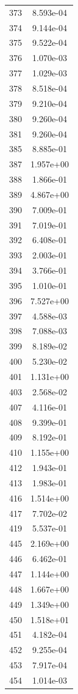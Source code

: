 \documentclass[12pt]{article}
\begin{document}
\begin{longtable}{@{}cc@{}}
373 & 8.593e-04 \\
374 & 9.144e-04 \\
375 & 9.522e-04 \\
376 & 1.070e-03 \\
377 & 1.029e-03 \\
378 & 8.518e-04 \\
379 & 9.210e-04 \\
380 & 9.260e-04 \\
381 & 9.260e-04 \\
385 & 8.885e-01 \\
387 & 1.957e+00 \\
388 & 1.866e-01 \\
389 & 4.867e+00 \\
390 & 7.009e-01 \\
391 & 7.019e-01 \\
392 & 6.408e-01 \\
393 & 2.003e-01 \\
394 & 3.766e-01 \\
395 & 1.010e-01 \\
396 & 7.527e+00 \\
397 & 4.588e-03 \\
398 & 7.088e-03 \\
399 & 8.189e-02 \\
400 & 5.230e-02 \\
401 & 1.131e+00 \\
403 & 2.568e-02 \\
407 & 4.116e-01 \\
408 & 9.399e-01 \\
409 & 8.192e-01 \\
410 & 1.155e+00 \\
412 & 1.943e-01 \\
413 & 1.983e-01 \\
416 & 1.514e+00 \\
417 & 7.702e-02 \\
419 & 5.537e-01 \\
445 & 2.169e+00 \\
446 & 6.462e-01 \\
447 & 1.144e+00 \\
448 & 1.667e+00 \\
449 & 1.349e+00 \\
450 & 1.518e+01 \\
451 & 4.182e-04 \\
452 & 9.255e-04 \\
453 & 7.917e-04 \\
454 & 1.014e-03 \\

\end{longtable}
\end{document}
